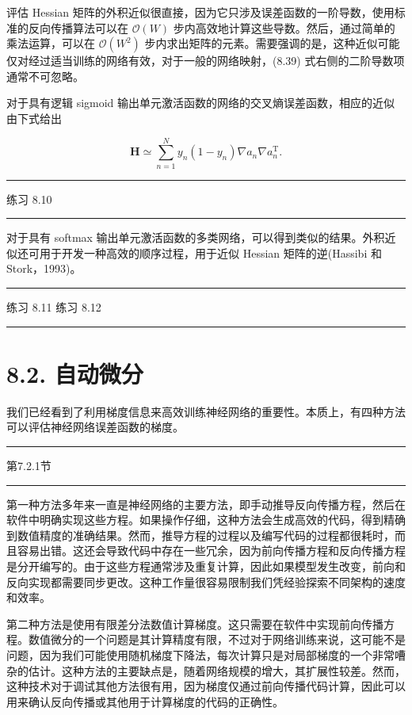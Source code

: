 \documentclass[10pt]{report}
\newcommand{\HRule}{\begin{center}\rule{0.9\linewidth}{0.2mm}\end{center}}
\begin{document}
评估 Hessian 矩阵的外积近似很直接，因为它只涉及误差函数的一阶导数，使用标准的反向传播算法可以在 \(\mathcal{O}\left( W\right)\) 步内高效地计算这些导数。然后，通过简单的乘法运算，可以在 \(\mathcal{O}\left( {W}^{2}\right)\) 步内求出矩阵的元素。需要强调的是，这种近似可能仅对经过适当训练的网络有效，对于一般的网络映射，(8.39) 式右侧的二阶导数项通常不可忽略。

对于具有逻辑 sigmoid 输出单元激活函数的网络的交叉熵误差函数，相应的近似由下式给出

\[
\mathbf{H} \simeq  \mathop{\sum }\limits_{{n = 1}}^{N}{y}_{n}\left( {1 - {y}_{n}}\right) \nabla {a}_{n}\nabla {a}_{n}^{\mathrm{T}}. \tag{8.41}
\]

\HRule

练习 8.10

\HRule

对于具有 softmax 输出单元激活函数的多类网络，可以得到类似的结果。外积近似还可用于开发一种高效的顺序过程，用于近似 Hessian 矩阵的逆(Hassibi 和 Stork，1993)。

\HRule

练习 8.11 练习 8.12

\HRule

\section*{8.2. 自动微分}

我们已经看到了利用梯度信息来高效训练神经网络的重要性。本质上，有四种方法可以评估神经网络误差函数的梯度。

\HRule

第7.2.1节

\HRule

第一种方法多年来一直是神经网络的主要方法，即手动推导反向传播方程，然后在软件中明确实现这些方程。如果操作仔细，这种方法会生成高效的代码，得到精确到数值精度的准确结果。然而，推导方程的过程以及编写代码的过程都很耗时，而且容易出错。这还会导致代码中存在一些冗余，因为前向传播方程和反向传播方程是分开编写的。由于这些方程通常涉及重复计算，因此如果模型发生改变，前向和反向实现都需要同步更改。这种工作量很容易限制我们凭经验探索不同架构的速度和效率。

第二种方法是使用有限差分法数值计算梯度。这只需要在软件中实现前向传播方程。数值微分的一个问题是其计算精度有限，不过对于网络训练来说，这可能不是问题，因为我们可能使用随机梯度下降法，每次计算只是对局部梯度的一个非常嘈杂的估计。这种方法的主要缺点是，随着网络规模的增大，其扩展性较差。然而，这种技术对于调试其他方法很有用，因为梯度仅通过前向传播代码计算，因此可以用来确认反向传播或其他用于计算梯度的代码的正确性。
\end{document}
